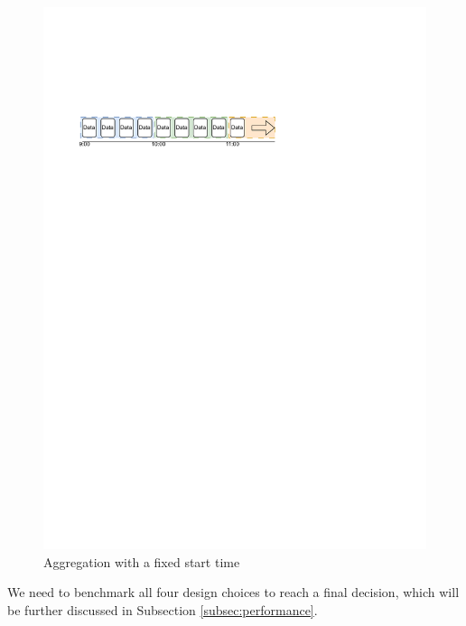 \begin{figure}[H]
    \centering
    \includegraphics[width=1\textwidth]{figures/fixed-sliding-window.pdf}
    \caption{Aggregation with a fixed start time}
    \label{fig_fixed_sliding_window}
\end{figure}

We need to benchmark all four design choices to reach a final decision, which will be further discussed in Subsection \ref{subsec:performance}.


